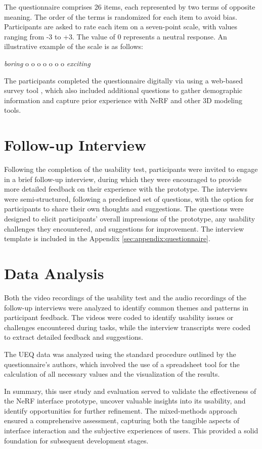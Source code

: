 The questionnaire comprises 26 items, each represented by two terms of opposite meaning. The order of the terms is randomized for each item to avoid bias.
Participants are asked to rate each item on a seven-point scale, with values ranging from -3 to +3. The value of 0 represents a neutral response.
An illustrative example of the scale is as follows:

\begin{center}
  \emph{boring} \quad o o o o o o o \quad \emph{exciting}
\end{center}

The participants completed the questionnaire digitally via using a web-based survey tool \cite{noauthor_sosci_nodate}, which also included additional questions to gather demographic information and capture prior experience with NeRF and other 3D modeling tools.

\section{Follow-up Interview}
\label{sec:study:interview}

Following the completion of the usability test, participants were invited to engage in a brief follow-up interview, during which they were encouraged to provide more detailed feedback on their experience with the prototype.
The interviews were semi-structured, following a predefined set of questions, with the option for participants to share their own thoughts and suggestions.
The questions were designed to elicit participants' overall impressions of the prototype, any usability challenges they encountered, and suggestions for improvement.
The interview template is included in the Appendix \ref{sec:appendix:questionnaire}.

\section{Data Analysis}
\label{sec:study:analysis}

Both the video recordings of the usability test and the audio recordings of the follow-up interviews were analyzed to identify common themes and patterns in participant feedback.
The videos were coded to identify usability issues or challenges encountered during tasks, while the interview transcripts were coded to extract detailed feedback and suggestions.

The UEQ data was analyzed using the standard procedure outlined by the questionnaire's authors, which involved the use of a spreadsheet tool for the calculation of all necessary values and the visualization of the results.

In summary, this user study and evaluation served to validate the effectiveness of the NeRF interface prototype, uncover valuable insights into its usability, and identify opportunities for further refinement.
The mixed-methods approach ensured a comprehensive assessment, capturing both the tangible aspects of interface interaction and the subjective experiences of users. This provided a solid foundation for subsequent development stages.
